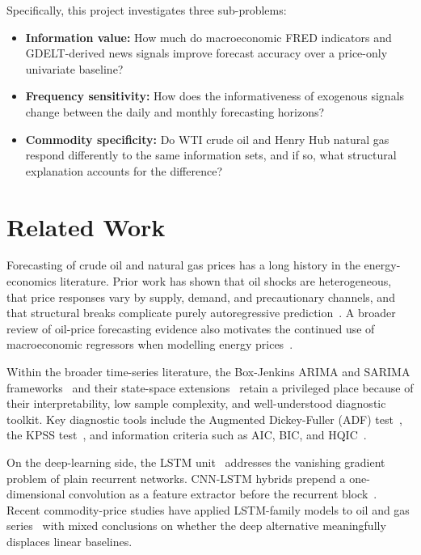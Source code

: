 \documentclass[12pt,a4paper]{article}
\begin{document}
Specifically, this project investigates three sub-problems:

\begin{itemize}[leftmargin=*]
  \item \textbf{Information value:} How much do macroeconomic FRED indicators and GDELT-derived news signals improve forecast accuracy over a price-only univariate baseline?
  \item \textbf{Frequency sensitivity:} How does the informativeness of exogenous signals change between the daily and monthly forecasting horizons?
  \item \textbf{Commodity specificity:} Do WTI crude oil and Henry Hub natural gas respond differently to the same information sets, and if so, what structural explanation accounts for the difference?
\end{itemize}

\section{Related Work}\label{sec:related}

Forecasting of crude oil and natural gas prices has a long history in the energy-economics literature. Prior work has shown that oil shocks are heterogeneous, that price responses vary by supply, demand, and precautionary channels, and that structural breaks complicate purely autoregressive prediction~\citep{hamilton2009causes,hamilton2003what,kilian2009not}. A broader review of oil-price forecasting evidence also motivates the continued use of macroeconomic regressors when modelling energy prices~\citep{baumeister2016forty}.

Within the broader time-series literature, the Box-Jenkins ARIMA and SARIMA frameworks~\citep{box1976time} and their state-space extensions~\citep{durbin2012time} retain a privileged place because of their interpretability, low sample complexity, and well-understood diagnostic toolkit. Key diagnostic tools include the Augmented Dickey-Fuller (ADF) test~\citep{dickey1979distribution}, the KPSS test~\citep{kwiatkowski1992testing}, and information criteria such as AIC, BIC, and HQIC~\citep{akaike1974new}.

On the deep-learning side, the LSTM unit~\citep{hochreiter1997long,gers2000learning} addresses the vanishing gradient problem of plain recurrent networks. CNN-LSTM hybrids prepend a one-dimensional convolution as a feature extractor before the recurrent block~\citep{lecun1998gradient,sainath2015convolutional,kim2019predicting}. Recent commodity-price studies have applied LSTM-family models to oil and gas series~\citep{cen2019crude,busari2021crude} with mixed conclusions on whether the deep alternative meaningfully displaces linear baselines.
\end{document}

